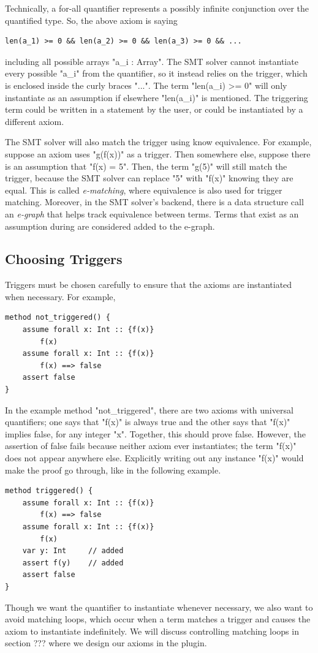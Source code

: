 \documentclass[msc,oneside]{ubcthesis}
\theoremstyle{definition}
\begin{document}
Technically, a for-all quantifier represents a possibly infinite conjunction over the quantified type. So, the above axiom is saying 
\begin{lstlisting}
len(a_1) >= 0 && len(a_2) >= 0 && len(a_3) >= 0 && ...
\end{lstlisting}
including all possible arrays "a_i : Array". The SMT solver cannot instantiate every possible "a_i" from the quantifier, so it instead relies on the trigger, which is enclosed inside the curly braces "{...}". The term "len(a_i) >= 0" will only instantiate as an assumption if elsewhere "len(a_i)" is mentioned. The triggering term could be written in a statement by the user, or could be instantiated by a different axiom. 

The SMT solver will also match the trigger using know equivalence. For example, suppose an axiom uses "{g(f(x))}" as a trigger. Then somewhere else, suppose there is an assumption that "f(x) = 5". Then,  the term "g(5)" will still match the trigger, because the SMT solver can replace "5" with "f(x)" knowing they are equal. This is called \emph{e-matching}, where equivalence is also used for trigger matching. Moreover, in the SMT solver's backend, there is a data structure call an \emph{e-graph} that helps track equivalence between terms. Terms that exist as an assumption during are considered added to the e-graph. 

\subsection{Choosing Triggers}
Triggers must be chosen carefully to ensure that the axioms are instantiated when necessary. For example, 
\begin{lstlisting}
method not_triggered() {
    assume forall x: Int :: {f(x)}
        f(x)
    assume forall x: Int :: {f(x)}
        f(x) ==> false
    assert false 
}
\end{lstlisting}
In the example method "not_triggered", there are two axioms with universal quantifiers; one says that "f(x)" is always true and the other says that "f(x)" implies false, for any integer "x". Together, this should prove false. However, the assertion of false fails because neither axiom ever instantiates; the term "f(x)" does not appear anywhere else. Explicitly writing out any instance "f(x)" would make the proof go through, like in the following example.
\begin{lstlisting}
method triggered() {
    assume forall x: Int :: {f(x)}
        f(x) ==> false
    assume forall x: Int :: {f(x)}
        f(x)
    var y: Int     // added
    assert f(y)    // added
    assert false 
}
\end{lstlisting}
Though we want the quantifier to instantiate whenever necessary, we also want to avoid matching loops, which occur when a term matches a trigger and causes the axiom to instantiate indefinitely. We will discuss controlling matching loops in section ??? where we design our axioms in the plugin.
\end{document}
